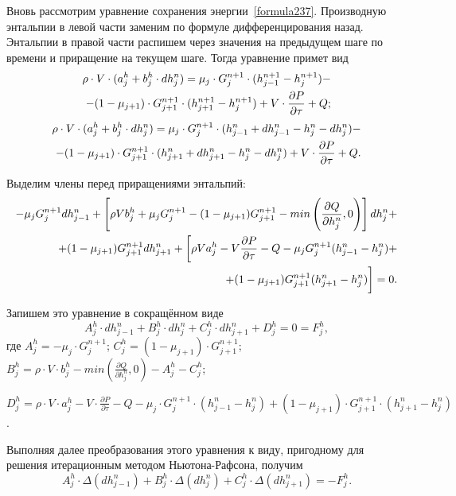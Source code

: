 
\label{sec:subsection71}
Вновь рассмотрим уравнение сохранения энергии~\eqref{formula237}. Производную энтальпии в левой части заменим по формуле дифференцирования назад. Энтальпии в правой части распишем через значения на предыдущем шаге по времени и приращение на текущем шаге. Тогда уравнение примет вид
\begin{align}
\label{formula71}
\rho\cdot V\cdot (a_j^h+b_j^h\cdot dh_j^n)=\mu_j \cdot G_j^{n+1} \cdot (h_{j-1}^{n+1}-h_j^{n+1}) - \notag \\
-(1-\mu_{j+1})\cdot G_{j+1}^{n+1} \cdot (h_{j+1}^{n+1}-h_j^{n+1})  
+ V\cdot\frac{\partial P}{\partial\tau} + Q;
\end{align}  
\begin{align}
\label{formula72}
\rho\cdot V\cdot (a_j^h+b_j^h\cdot dh_j^n)=\mu_j \cdot G_j^{n+1} \cdot (h_{j-1}^n + dh_{j-1}^n - h_j^n - dh_j^n)- \notag \\
-(1-\mu_{j+1})\cdot G_{j+1}^{n+1} \cdot (h_{j+1}^n + dh_{j+1}^n - h_j^n - dh_j^n) 
+ V\cdot\frac{\partial P}{\partial\tau} + Q.
\end{align}

Выделим члены перед приращениями энтальпий:
\begin{align}
\label{formula73}
- \mu_j G_j^{n+1} dh_{j-1}^n + \left[\rho V b_j^h + \mu_j G_j^{n+1} - (1-\mu_{j+1}) G_{j+1}^{n+1} - min\left(\frac{\partial Q}{\partial h_j^n},0 \right) \right] dh_j^n + \notag \\
+ (1-\mu_{j+1}) G_{j+1}^{n+1} dh_{j+1}^n + \bigg[\rho V a_j^h-V \frac{\partial P}{\partial\tau}-Q - \mu_j G_j^{n+1} (h_{j-1}^n - h_j^n) + \notag \\
+ (1-\mu_{j+1}) G_{j+1}^{n+1} (h_{j+1}^n - h_j^n)\bigg] = 0.  
\end{align}

Запишем это уравнение в сокращённом виде
\begin{equation}
\label{formula74}
A_j^h \cdot dh_{j-1}^n + B_j^h \cdot dh_j^n + C_j^h \cdot dh_{j+1}^n + D_j^h = 0 = F_j^h,
\end{equation}
где $A_j^h=- \mu_j \cdot G_j^{n+1}$; $C_j^h = (1-\mu_{j+1}) \cdot G_{j+1}^{n+1}$;
$B_j^h = \rho \cdot V \cdot b_j^h - min\left(\frac{\partial Q}{\partial h_j^n},0 \right)-A_j^h-C_j^h$;

\noindent $D_j^h=\rho \cdot V \cdot a_j^h-V \cdot \frac{\partial P}{\partial\tau}-Q - \mu_j \cdot G_j^{n+1} \cdot (h_{j-1}^n - h_j^n) + (1-\mu_{j+1}) \cdot G_{j+1}^{n+1} \cdot (h_{j+1}^n - h_j^n)$.

Выполняя далее преобразования этого уравнения к виду, пригодному для решения итерационным методом Ньютона-Рафсона, получим
\begin{equation}
\label{formula75}
A_j^h \cdot \Delta(dh_{j-1}^n) + B_j^h \cdot \Delta(dh_j^n) + C_j^h \cdot \Delta(dh_{j+1}^n)  = -F_j^h.
\end{equation}

